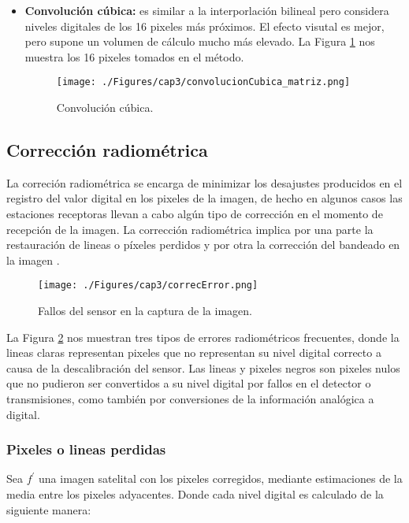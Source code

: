 \begin{itemize}
		    		\item \textbf{Convoluci\'on c\'ubica:} es similar a la interporlaci\'on bilineal pero considera niveles digitales de los 16 pixeles m\'as pr\'oximos. El efecto visutal es mejor, pero supone un volumen de c\'alculo mucho m\'as elevado. La Figura \ref{fig:convCubica2} nos muestra los 16 pixeles tomados en el m\'etodo. 
		    				    \begin{figure}[H]
		    				    	\centering
		    				    	\texttt{[image: ./Figures/cap3/convolucionCubica\_matriz.png]}
		    				    	\caption{Convoluci\'on c\'ubica.}
		    				    	\label{fig:convCubica2}
		    				    \end{figure}
	\end{itemize}
\subsection{Correcci\'on radiom\'etrica}
La correci\'on radiom\'etrica se encarga de minimizar los desajustes producidos en el registro del valor digital en los pixeles de la imagen, de hecho en algunos casos las estaciones receptoras llevan a cabo alg\'un tipo de correcci\'on en el momento de recepci\'on de la imagen. La corrección radiom\'etrica implica por una parte la restauraci\'on de lineas o p\'ixeles perdidos y por otra la correcci\'on del bandeado en la imagen \cite{teledUm}.
    \begin{figure}[H]
    	\centering
    	\texttt{[image: ./Figures/cap3/correcError.png]}
    	\caption{Fallos del sensor en la captura de la imagen.}
    	\label{fig:correcError}
    \end{figure}
La Figura \ref{fig:correcError} nos muestran tres tipos de errores radiom\'etricos frecuentes, donde la lineas claras representan pixeles que no representan su nivel digital correcto a causa de la descalibraci\'on del sensor. Las lineas y pixeles negros son pixeles nulos que no pudieron ser convertidos a su nivel digital por fallos en el detector o transmisiones, como tambi\'en por conversiones de la informaci\'on anal\'ogica a digital.

\subsubsection{Pixeles o lineas perdidas}\label{subsec:pixelesP}
Sea $ f^{'} $ una imagen satelital con los pixeles corregidos, mediante estimaciones de la media entre los pixeles adyacentes. Donde cada nivel digital es calculado de la siguiente manera: 

